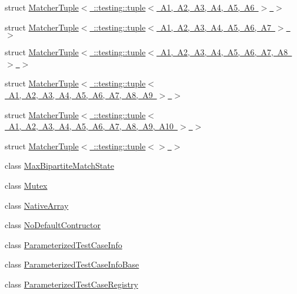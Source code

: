 \begin{DoxyCompactItemize}
\item 
struct \mbox{\hyperlink{structtesting_1_1internal_1_1MatcherTuple_3_01_1_1testing_1_1tuple_3_01A1_00_01A2_00_01A3_00_01A4_00_01A5_00_01A6_01_4_01_4}{Matcher\+Tuple$<$ \+::testing\+::tuple$<$ A1, A2, A3, A4, A5, A6 $>$ $>$}}
\item 
struct \mbox{\hyperlink{structtesting_1_1internal_1_1MatcherTuple_3_01_1_1testing_1_1tuple_3_01A1_00_01A2_00_01A3_00_01A63c742e825c64dbe2671b0a407b3db47}{Matcher\+Tuple$<$ \+::testing\+::tuple$<$ A1, A2, A3, A4, A5, A6, A7 $>$ $>$}}
\item 
struct \mbox{\hyperlink{structtesting_1_1internal_1_1MatcherTuple_3_01_1_1testing_1_1tuple_3_01A1_00_01A2_00_01A3_00_01Aed2bba98e2ef5f11a8df3506707ec6d8}{Matcher\+Tuple$<$ \+::testing\+::tuple$<$ A1, A2, A3, A4, A5, A6, A7, A8 $>$ $>$}}
\item 
struct \mbox{\hyperlink{structtesting_1_1internal_1_1MatcherTuple_3_01_1_1testing_1_1tuple_3_01A1_00_01A2_00_01A3_00_01Aa73012c63a4e11ec83732b0fb70972c7}{Matcher\+Tuple$<$ \+::testing\+::tuple$<$ A1, A2, A3, A4, A5, A6, A7, A8, A9 $>$ $>$}}
\item 
struct \mbox{\hyperlink{structtesting_1_1internal_1_1MatcherTuple_3_01_1_1testing_1_1tuple_3_01A1_00_01A2_00_01A3_00_01Aa256ea461b02eca0db9561b7bbf2c82d}{Matcher\+Tuple$<$ \+::testing\+::tuple$<$ A1, A2, A3, A4, A5, A6, A7, A8, A9, A10 $>$ $>$}}
\item 
struct \mbox{\hyperlink{structtesting_1_1internal_1_1MatcherTuple_3_01_1_1testing_1_1tuple_3_4_01_4}{Matcher\+Tuple$<$ \+::testing\+::tuple$<$$>$ $>$}}
\item 
class \mbox{\hyperlink{classtesting_1_1internal_1_1MaxBipartiteMatchState}{Max\+Bipartite\+Match\+State}}
\item 
class \mbox{\hyperlink{classtesting_1_1internal_1_1Mutex}{Mutex}}
\item 
class \mbox{\hyperlink{classtesting_1_1internal_1_1NativeArray}{Native\+Array}}
\item 
class \mbox{\hyperlink{classtesting_1_1internal_1_1NoDefaultContructor}{No\+Default\+Contructor}}
\item 
class \mbox{\hyperlink{classtesting_1_1internal_1_1ParameterizedTestCaseInfo}{Parameterized\+Test\+Case\+Info}}
\item 
class \mbox{\hyperlink{classtesting_1_1internal_1_1ParameterizedTestCaseInfoBase}{Parameterized\+Test\+Case\+Info\+Base}}
\item 
class \mbox{\hyperlink{classtesting_1_1internal_1_1ParameterizedTestCaseRegistry}{Parameterized\+Test\+Case\+Registry}}

\end{DoxyCompactItemize}
